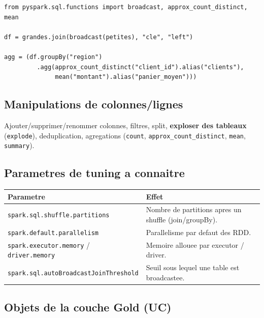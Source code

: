 \documentclass[11pt,a4paper]{article}
\begin{document}
\begin{lstlisting}[style=pystyle,caption={Broadcast join et agregations}]
from pyspark.sql.functions import broadcast, approx_count_distinct, mean

df = grandes.join(broadcast(petites), "cle", "left")

agg = (df.groupBy("region")
         .agg(approx_count_distinct("client_id").alias("clients"),
              mean("montant").alias("panier_moyen")))
\end{lstlisting}

\subsection{Manipulations de colonnes/lignes}

Ajouter/supprimer/renommer colonnes, filtres, split, \textbf{exploser des tableaux}
(\texttt{explode}), deduplication, agregations (\texttt{count}, \texttt{approx\_count\_distinct},
\texttt{mean}, \texttt{summary}).

\subsection{Parametres de tuning a connaitre}

\begin{center}
\renewcommand{\arraystretch}{1.3}
\begin{tabular}{@{}p{6.5cm}p{8cm}@{}}
\toprule
\textbf{Parametre} & \textbf{Effet} \\
\midrule
\texttt{spark.sql.shuffle.partitions} & Nombre de partitions apres un shuffle (join/groupBy). \\
\texttt{spark.default.parallelism} & Parallelisme par defaut des RDD. \\
\texttt{spark.executor.memory} / \texttt{driver.memory} & Memoire allouee par executor / driver. \\
\texttt{spark.sql.autoBroadcastJoinThreshold} & Seuil sous lequel une table est broadcastee. \\
\bottomrule
\end{tabular}
\end{center}

\subsection{Objets de la couche Gold (UC)}
\end{document}
